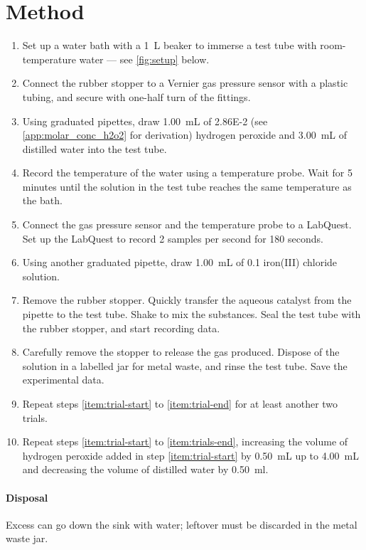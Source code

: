 \documentclass[a4paper, 12pt]{article}
\begin{document}
\section{Method}
\begin{enumerate}
    \item Set up a water bath with a \SI{1}{\L} beaker to immerse a test tube with room-temperature water --- see \cref{fig:setup} below.
    \item Connect the rubber stopper to a Vernier gas pressure sensor with a plastic tubing, and secure with one-half turn of the fittings.
    \item \label{item:trial-start} Using graduated pipettes, draw \SI{1.00}{\mL} of \SI{2.86E-2}{\molar} (see \cref{app:molar_conc_h2o2} for derivation) hydrogen peroxide and \SI{3.00}{\mL} of distilled water into the test tube.
    \item Record the temperature of the water using a temperature probe. Wait for 5 minutes until the solution in the test tube reaches the same temperature as the bath.
    \item Connect the gas pressure sensor and the temperature probe to a LabQuest. Set up the LabQuest to record 2 samples per second for 180 seconds.
    \item Using another graduated pipette, draw \SI{1.00}{\mL} of \SI{0.1}{\molar} iron(III) chloride solution.
    \item Remove the rubber stopper. Quickly transfer the aqueous catalyst from the pipette to the test tube. Shake to mix the substances. Seal the test tube with the rubber stopper, and start recording data.
    \item \label{item:trial-end} Carefully remove the stopper to release the gas produced. Dispose of the solution in a labelled jar for metal waste, and rinse the test tube. Save the experimental data.
    \item \label{item:trials-end} Repeat steps \ref{item:trial-start} to \ref{item:trial-end} for at least another two trials.
    \item Repeat steps \ref{item:trial-start} to \ref{item:trials-end}, increasing the volume of hydrogen peroxide added in step \ref{item:trial-start} by \SI{0.50}{\mL} up to \SI{4.00}{\mL} and decreasing the volume of distilled water by \SI{0.50}{\ml}.
\end{enumerate}
\paragraph{Disposal} Excess  can go down the sink with water; leftover  must be discarded in the metal waste jar.
\end{document}
